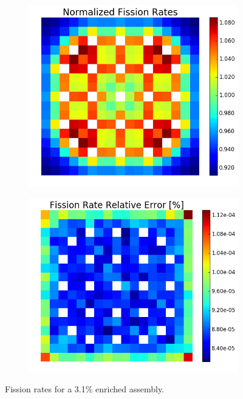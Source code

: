 \begin{figure}[h!]
\centering
\begin{subfigure}{0.44\textwidth}
  \centering
  \includegraphics[width=\linewidth]{figures/benchmarks/fission-rates/fiss-mean-fuel-31}
  \caption{}
  \label{fig:chap7-fiss-rate-mean-3.1-assm}
\end{subfigure}%
\begin{subfigure}{0.44\textwidth}
  \centering
  \includegraphics[width=\linewidth]{figures/benchmarks/fission-rates/fiss-rel-err-fuel-31}
  \caption{}
  \label{fig:chap7-fiss-rate-rel-err-3.1-assm}
\end{subfigure}%
\caption[Fission rates for a 3.1\% enriched assembly]{Fission rates for a 3.1\% enriched assembly.}
\label{fig:chap7-fiss-rates-3.1-assm}
\end{figure}

